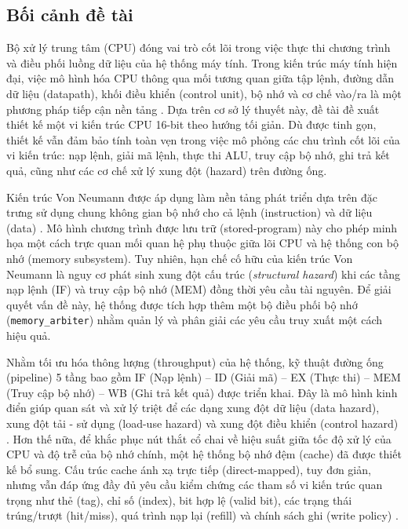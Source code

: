 \documentclass[11pt,a4paper]{article}
\theoremstyle{definition}
\theoremstyle{remark}
\begin{document}
	\subsection{Bối cảnh đề tài}
	Bộ xử lý trung tâm (CPU) đóng vai trò cốt lõi trong việc thực thi chương trình và điều phối luồng dữ liệu của hệ thống máy tính. Trong kiến trúc máy tính hiện đại, việc mô hình hóa CPU thông qua mối tương quan giữa tập lệnh, đường dẫn dữ liệu (datapath), khối điều khiển (control unit), bộ nhớ và cơ chế vào/ra là một phương pháp tiếp cận nền tảng \cite{patterson,hennessy}. Dựa trên cơ sở lý thuyết này, đề tài đề xuất thiết kế một vi kiến trúc CPU 16-bit theo hướng tối giản. Dù được tinh gọn, thiết kế vẫn đảm bảo tính toàn vẹn trong việc mô phỏng các chu trình cốt lõi của vi kiến trúc: nạp lệnh, giải mã lệnh, thực thi ALU, truy cập bộ nhớ, ghi trả kết quả, cũng như các cơ chế xử lý xung đột (hazard) trên đường ống.
	
	Kiến trúc Von Neumann được áp dụng làm nền tảng phát triển dựa trên đặc trưng sử dụng chung không gian bộ nhớ cho cả lệnh (instruction) và dữ liệu (data) \cite{vonneumann,patterson}. Mô hình chương trình được lưu trữ (stored-program) này cho phép minh họa một cách trực quan mối quan hệ phụ thuộc giữa lõi CPU và hệ thống con bộ nhớ (memory subsystem). Tuy nhiên, hạn chế cố hữu của kiến trúc Von Neumann là nguy cơ phát sinh xung đột cấu trúc (\textit{structural hazard}) khi các tầng nạp lệnh (IF) và truy cập bộ nhớ (MEM) đồng thời yêu cầu tài nguyên. Để giải quyết vấn đề này, hệ thống được tích hợp thêm một bộ điều phối bộ nhớ (\texttt{memory\_arbiter}) nhằm quản lý và phân giải các yêu cầu truy xuất một cách hiệu quả.
	
	Nhằm tối ưu hóa thông lượng (throughput) của hệ thống, kỹ thuật đường ống (pipeline) 5 tầng bao gồm IF (Nạp lệnh) – ID (Giải mã) – EX (Thực thi) – MEM (Truy cập bộ nhớ) – WB (Ghi trả kết quả) được triển khai. Đây là mô hình kinh điển giúp quan sát và xử lý triệt để các dạng xung đột dữ liệu (data hazard), xung đột tải - sử dụng (load-use hazard) và xung đột điều khiển (control hazard) \cite{patterson,hennessy}. Hơn thế nữa, để khắc phục nút thắt cổ chai về hiệu suất giữa tốc độ xử lý của CPU và độ trễ của bộ nhớ chính, một hệ thống bộ nhớ đệm (cache) đã được thiết kế bổ sung. Cấu trúc cache ánh xạ trực tiếp (direct-mapped), tuy đơn giản, nhưng vẫn đáp ứng đầy đủ yêu cầu kiểm chứng các tham số vi kiến trúc quan trọng như thẻ (tag), chỉ số (index), bit hợp lệ (valid bit), các trạng thái trúng/trượt (hit/miss), quá trình nạp lại (refill) và chính sách ghi (write policy) \cite{hennessy,patterson}.
	
\end{document}
